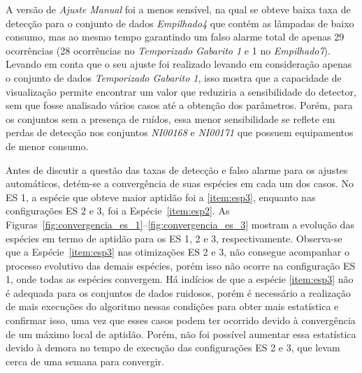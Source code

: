 A versão de \emph{Ajuste Manual} foi a menos sensível, na qual se
obteve baixa taxa de detecção para o conjunto de dados
\emph{Empilhado4} que contém as lâmpadas de baixo consumo, mas ao
mesmo tempo garantindo um falso alarme total de apenas 29 ocorrências
(28 ocorrências no \emph{Temporizado Gabarito 1} e 1 no
\emph{Empilhado7}). Levando em conta que o seu ajuste foi realizado
levando em consideração apenas o conjunto de dados \emph{Temporizado
Gabarito 1}, isso mostra que a capacidade de visualização permite
encontrar um valor que reduziria a sensibilidade do detector, sem que
fosse analisado vários casos até a obtenção dos parâmetros.  Porém,
para os conjuntos sem a presença de ruídos, essa menor sensibilidade
se reflete em perdas de detecção nos conjuntos \emph{NI00168} e
\emph{NI00171} que possuem equipamentos de menor consumo.

Antes de discutir a questão das taxas de detecção e falso alarme para
os ajustes automáticos, detém-se a convergência de suas espécies em
cada um dos casos. No ES 1, a espécie que obteve maior aptidão foi a
\ref{item:esp3}, enquanto nas configurações ES 2 e 3, foi a
Espécie~\ref{item:esp2}. As
Figuras~\ref{fig:convergencia_es_1}--\ref{fig:convergencia_es_3}
mostram a evolução das espécies em termo de aptidão para os ES 1, 2 e
3, respectivamente. Observa-se que a Espécie~\ref{item:esp3} nas
otimizações ES 2 e 3, não consegue acompanhar o processo evolutivo das
demais espécies, porém isso não ocorre na configuração ES 1, onde
todas as espécies convergem. Há indícios de que a espécie
\ref{item:esp3} não é adequada para os conjuntos de dados ruidosos,
porém é necessário a realização de mais execuções do algoritmo nessas
condições para obter mais estatística e confirmar isso, uma vez que
esses casos podem ter ocorrido devido à convergência de um máximo
local de aptidão. Porém, não foi possível aumentar essa estatística
devido à demora no tempo de execução das configurações ES 2 e 3, que
levam cerca de uma semana para convergir. 

